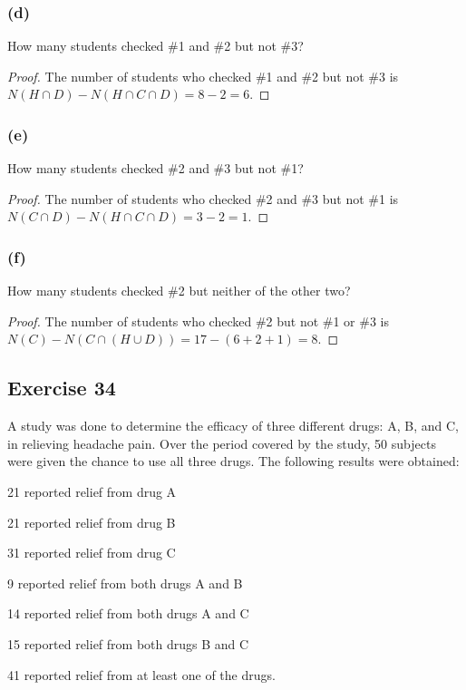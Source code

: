 \documentclass[14pt]{extarticle}
\begin{document}
\subsubsection{(d)}
How many students checked \#1 and \#2 but not \#3?

\begin{proof}
The number of students who checked \#1 and \#2 but not \#3 is \(N(H \cap D) - N(H \cap C \cap D) = 8 - 2 = 6\).
\end{proof}

\subsubsection{(e)}
How many students checked \#2 and \#3 but not \#1?

\begin{proof}
The number of students who checked \#2 and \#3 but not \#1 is \(N(C \cap D) - N(H \cap C \cap D) = 3 - 2 = 1\).
\end{proof}

\subsubsection{(f)}
How many students checked \#2 but neither of the other two?

\begin{proof}
The number of students who checked \#2 but not \#1 or \#3 is \(N(C) - N(C \cap (H \cup D)) = 17 - (6+2+1) = 8\).
\end{proof}

\subsection{Exercise 34}
A study was done to determine the efficacy of three different drugs: A, B, and C, in relieving headache pain. 
Over the period covered by the study, 50 subjects were given the chance to use all three drugs. The following 
results were obtained: 

21 reported relief from drug A

21 reported relief from drug B

31 reported relief from drug C

9 reported relief from both drugs A and B

14 reported relief from both drugs A and C

15 reported relief from both drugs B and C

41 reported relief from at least one of the drugs.
\end{document}
